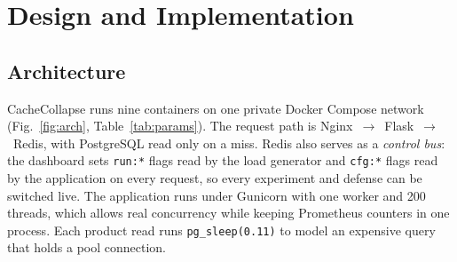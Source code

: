 \documentclass[journal]{IEEEtran}
\begin{document}
\section{Design and Implementation}
\label{sec:design}

\subsection{Architecture}
CacheCollapse runs nine containers on one private Docker Compose network
\cite{dockercompose} (Fig.~\ref{fig:arch}, Table~\ref{tab:params}). The request path is
Nginx~$\rightarrow$~Flask~$\rightarrow$~Redis, with PostgreSQL read only on a miss.
Redis also serves as a \emph{control bus}: the dashboard sets \texttt{run:*} flags read
by the load generator and \texttt{cfg:*} flags read by the application on every
request, so every experiment and defense can be switched live. The application runs
under Gunicorn with one worker and 200 threads, which allows real concurrency while
keeping Prometheus counters in one process. Each product read runs
\texttt{pg\_sleep(0.11)} to model an expensive query that holds a pool connection.
\end{document}
